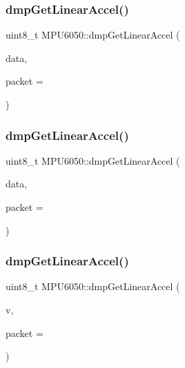 \mbox{\label{classMPU6050_aa36d05bce800803489ae4da91f63ed2d}} 
\subsubsection{\texorpdfstring{dmpGetLinearAccel()}{dmpGetLinearAccel()}\hspace{0.1cm}{\footnotesize\ttfamily [1/4]}}
{\footnotesize\ttfamily uint8\+\_\+t M\+P\+U6050\+::dmp\+Get\+Linear\+Accel (\begin{DoxyParamCaption}\item[{int32\+\_\+t $\ast$}]{data,  }\item[{const uint8\+\_\+t $\ast$}]{packet = {} }\end{DoxyParamCaption})}

\mbox{\label{classMPU6050_ac3a746d1a5c2d9973f2315bd998fb102}} 
\subsubsection{\texorpdfstring{dmpGetLinearAccel()}{dmpGetLinearAccel()}\hspace{0.1cm}{\footnotesize\ttfamily [2/4]}}
{\footnotesize\ttfamily uint8\+\_\+t M\+P\+U6050\+::dmp\+Get\+Linear\+Accel (\begin{DoxyParamCaption}\item[{int16\+\_\+t $\ast$}]{data,  }\item[{const uint8\+\_\+t $\ast$}]{packet = {} }\end{DoxyParamCaption})}

\mbox{\label{classMPU6050_a72cfa08b409ce18689f19b81bd285780}} 
\subsubsection{\texorpdfstring{dmpGetLinearAccel()}{dmpGetLinearAccel()}\hspace{0.1cm}{\footnotesize\ttfamily [3/4]}}
{\footnotesize\ttfamily uint8\+\_\+t M\+P\+U6050\+::dmp\+Get\+Linear\+Accel (\begin{DoxyParamCaption}\item[{\mbox{\hyperlink{classVectorInt16}{Vector\+Int16}} $\ast$}]{v,  }\item[{const uint8\+\_\+t $\ast$}]{packet = {} }\end{DoxyParamCaption})}

